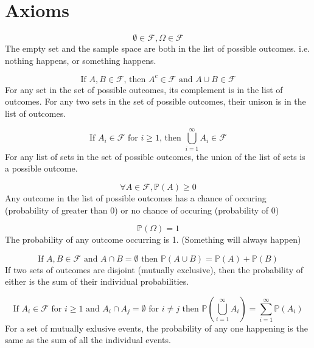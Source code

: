 \documentclass[fontsize=10pt]{article}
\numberwithin{equation}{subsection}
\newcommand{\PP}[1]{\mathbb{P}\left(#1\right)}
\newcommand{\FF}{\mathcal{F}}
\begin{document}
\section{Axioms}
\begin{itemize*}
\item\begin{equation}\tag{F$_1$}\label{f1}
\emptyset\in\FF,\Omega\in\FF
\end{equation}
The empty set and the sample space are both in the list of possible outcomes. i.e. nothing happens, or something happens.
\item\begin{equation}\tag{F$_2$}\label{f2}
\text{If }A,B\in\FF\text{, then }A^c\in\FF\text{ and }A\cup B\in \FF
\end{equation}
For any set in the set of possible outcomes, its complement is in the list of outcomes.
For any two sets in the set of possible outcomes, their unison is in the list of outcomes.
\item\begin{equation}\tag{F$_3$}\label{f3}
\text{If }A_i\in\FF\text{ for }i\ge1\text{, then }\bigcup^\infty_{i=1}A_i\in\FF
\end{equation}
For any list of sets in the set of possible outcomes, the union of the list of sets is a possible outcome.
\item\begin{equation}\tag{P$_1$}\label{p1}
\forall A\in\FF, \PP{A}\ge0 
\end{equation}
Any outcome in the list of possible outcomes has a chance of occuring (probability of greater than 0) or no chance of occuring (probability of 0)
\item\begin{equation}\tag{P$_2$}\label{p2}
\PP{\Omega}=1
\end{equation}
The probability of any outcome occurring is 1. (Something will always happen)
\item\begin{equation}\tag{P$_3$}\label{p3}
\text{If }A,B\in\FF\text{ and }A\cap B=\emptyset\text{ then }\PP{A\cup B}=\PP{A}+\PP{B}
\end{equation}
If two sets of outcomes are disjoint (mutually exclusive), then the probability of either is the sum of their individual probabilities.
\item\begin{equation}\tag{P$_4$}\label{p4}
\text{If }A_i\in\FF\text{ for }i\ge1\text{ and }A_i\cap A_j=\emptyset\text{ for }i\neq j\text{ then }\mathbb{P}\left(\bigcup_{i=1}^\infty A_i\right)=\sum_{i=1}^\infty \mathbb{P}\left(A_i\right)
\end{equation}
For a set of mutually exlusive events, the probability of any one happening is the same as the sum of all the individual events.
\end{itemize*}
\end{document}
